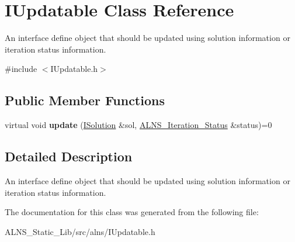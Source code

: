 \hypertarget{classIUpdatable}{\section{\-I\-Updatable \-Class \-Reference}
\label{classIUpdatable}
}


\-An interface define object that should be updated using solution information or iteration status information.  




{\ttfamily \#include $<$\-I\-Updatable.\-h$>$}

\subsection*{\-Public \-Member \-Functions}
\begin{DoxyCompactItemize}
\item 
\hypertarget{classIUpdatable_a827ad7762d82343eb1fa07406e74951c}{virtual void {\bfseries update} (\hyperlink{classISolution}{\-I\-Solution} \&sol, \hyperlink{classALNS__Iteration__Status}{\-A\-L\-N\-S\-\_\-\-Iteration\-\_\-\-Status} \&status)=0}\label{classIUpdatable_a827ad7762d82343eb1fa07406e74951c}

\end{DoxyCompactItemize}


\subsection{\-Detailed \-Description}
\-An interface define object that should be updated using solution information or iteration status information. 

\-The documentation for this class was generated from the following file\-:\begin{DoxyCompactItemize}
\item 
\-A\-L\-N\-S\-\_\-\-Static\-\_\-\-Lib/src/alns/\-I\-Updatable.\-h\end{DoxyCompactItemize}
